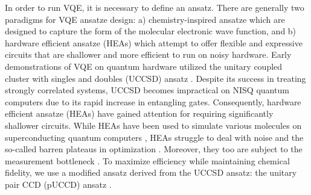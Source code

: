 \documentclass[journal,onecolumn]{IEEEtran}
\begin{document}
In order to run VQE, it is necessary to define an ansatz.
There are generally two paradigms for VQE ansatze design: a) chemistry-inspired ansatze which are designed to capture the form of the molecular electronic wave function, and b) hardware efficient ansatze (HEAs) which attempt to offer flexible and expressive circuits that are shallower and more efficient to run on noisy hardware.
%
Early demonstrations of VQE on quantum hardware utilized the unitary coupled cluster with singles and doubles (UCCSD) ansatz \cite{peruzzo2014variational, OMalley2016-ph, Colless2018-hi, McCaskey2019-gk, Nam2020-ct}. 
Despite its success in treating strongly correlated systems, UCCSD becomes impractical on NISQ quantum computers due to its rapid increase in entangling gates. 
Consequently, hardware efficient ansatze (HEAs) have gained attention for requiring significantly shallower circuits. 
While HEAs have been used to simulate various molecules on superconducting quantum computers \cite{kandala2017hardware, Kandala2019-rz, Gao2019-pp, Rice2021-mn, Gao2021-zt}, HEAs struggle to deal with noise and the so-called barren plateaus in optimization \cite{McClean2018-ku}. 
Moreover, they too are subject to the measurement bottleneck \cite{Gonthier2020-rh}.
%
To maximize efficiency while maintaining chemical fidelity, we use a modified ansatz derived from the UCCSD ansatz: the unitary pair CCD (pUCCD) ansatz \cite{Elfving2020-xf, Elfving2020-zx}. 
\end{document}
